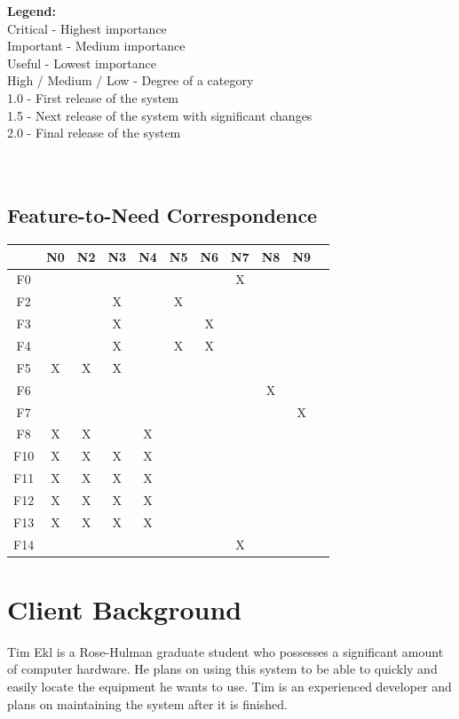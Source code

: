 \documentclass{article}
\begin{document}
\textbf{Legend:} \\
Critical - Highest importance \\
Important - Medium importance \\
Useful - Lowest importance \\
High / Medium / Low - Degree of a category \\
1.0 - First release of the system \\
1.5 - Next release of the system with significant changes \\
2.0 - Final release of the system \\
~\\
~\\
\subsection{Feature-to-Need Correspondence}
\begin{tabular}{ | c || c | c | c | c | c | c | c | c | c | c | }
\hline
    & N0 & N2 & N3 & N4 & N5 & N6 & N7 & N8 & N9 \\
\hline
\hline
F0  &    &    &    &    &    &    & X  &    &    \\
\hline
F2  &    &    & X  &    & X  &    &    &    &    \\
\hline
F3  &    &    & X  &    &    & X  &    &    &    \\
\hline
F4  &    &    & X  &    & X  & X  &    &    &    \\
\hline
F5  & X  & X  & X  &    &    &    &    &    &    \\
\hline
F6  &    &    &    &    &    &    &    & X  &    \\
\hline
F7  &    &    &    &    &    &    &    &    & X  \\
\hline
F8  & X  & X  &    & X  &    &    &    &    &    \\
\hline
F10 & X  & X  & X  & X  &    &    &    &    &    \\
\hline
F11 & X  & X  & X  & X  &    &    &    &    &    \\
\hline
F12 & X  & X  & X  & X  &    &    &    &    &    \\
\hline
F13 & X  & X  & X  & X  &    &    &    &    &    \\
\hline
F14 &    &    &    &    &    &    & X  &    &    \\
\hline
\end{tabular}

\section{Client Background}
Tim Ekl is a Rose-Hulman graduate student who possesses a significant amount of computer hardware.  He plans on using this system to be able to quickly and easily locate the equipment he wants to use.  Tim is an experienced developer and plans on maintaining the system after it is finished.  
\end{document}

